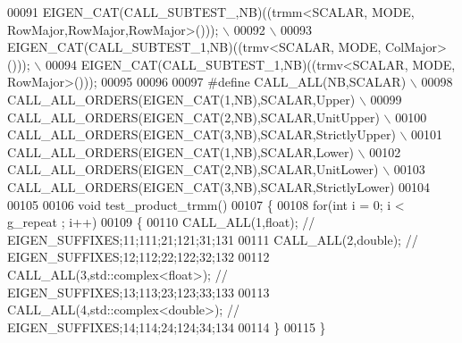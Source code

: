 \begin{DoxyCode}
00091 \textcolor{preprocessor}{  EIGEN\_CAT(CALL\_SUBTEST\_,NB)((trmm<SCALAR, MODE, RowMajor,RowMajor,RowMajor>()));  \(\backslash\)}
00092 \textcolor{preprocessor}{  \(\backslash\)}
00093 \textcolor{preprocessor}{  EIGEN\_CAT(CALL\_SUBTEST\_1,NB)((trmv<SCALAR, MODE, ColMajor>()));                   \(\backslash\)}
00094 \textcolor{preprocessor}{  EIGEN\_CAT(CALL\_SUBTEST\_1,NB)((trmv<SCALAR, MODE, RowMajor>()));}
00095 
00096   
00097 \textcolor{preprocessor}{#define CALL\_ALL(NB,SCALAR)                 \(\backslash\)}
00098 \textcolor{preprocessor}{  CALL\_ALL\_ORDERS(EIGEN\_CAT(1,NB),SCALAR,Upper)          \(\backslash\)}
00099 \textcolor{preprocessor}{  CALL\_ALL\_ORDERS(EIGEN\_CAT(2,NB),SCALAR,UnitUpper)      \(\backslash\)}
00100 \textcolor{preprocessor}{  CALL\_ALL\_ORDERS(EIGEN\_CAT(3,NB),SCALAR,StrictlyUpper)  \(\backslash\)}
00101 \textcolor{preprocessor}{  CALL\_ALL\_ORDERS(EIGEN\_CAT(1,NB),SCALAR,Lower)          \(\backslash\)}
00102 \textcolor{preprocessor}{  CALL\_ALL\_ORDERS(EIGEN\_CAT(2,NB),SCALAR,UnitLower)      \(\backslash\)}
00103 \textcolor{preprocessor}{  CALL\_ALL\_ORDERS(EIGEN\_CAT(3,NB),SCALAR,StrictlyLower)}
00104   
00105 
00106 \textcolor{keywordtype}{void} test\_product\_trmm()
00107 \{
00108   \textcolor{keywordflow}{for}(\textcolor{keywordtype}{int} i = 0; i < g\_repeat ; i++)
00109   \{
00110     CALL\_ALL(1,\textcolor{keywordtype}{float});                \textcolor{comment}{//  EIGEN\_SUFFIXES;11;111;21;121;31;131}
00111     CALL\_ALL(2,\textcolor{keywordtype}{double});               \textcolor{comment}{//  EIGEN\_SUFFIXES;12;112;22;122;32;132}
00112     CALL\_ALL(3,std::complex<float>);  \textcolor{comment}{//  EIGEN\_SUFFIXES;13;113;23;123;33;133}
00113     CALL\_ALL(4,std::complex<double>); \textcolor{comment}{//  EIGEN\_SUFFIXES;14;114;24;124;34;134}
00114   \}
00115 \}
\end{DoxyCode}
